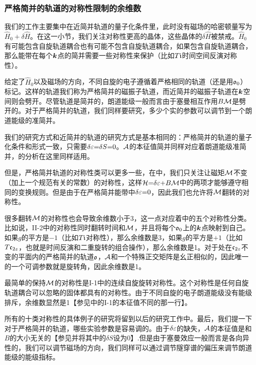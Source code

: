 \subsubsection{严格简并的轨道的对称性限制的余维数}\label{sec:codimexactdeg}

我们的工作主要集中在近简并轨道的量子化条件里，此时没有磁场的哈密顿量写为$\hat{H}_0{+}\delta \hat{H}$。在这一小节，我们关注对称性更高的晶体，这些晶体的$\delta \hat{H}$被禁戒。$\hat{H}_0$有可能包含自旋轨道耦合也有可能不包含自旋轨道耦合，如果包含自旋轨道耦合，那么能带在每个$\boldsymbol{k}$点的简并需要一些对称性来保护（比如$T\mathfrak{i}$时间空间反演对称性）。


给定了$\hat{H}_0$以及磁场的方向，不同自旋的电子遵循着严格相同的轨道（还是用$\mathfrak{o}_0$）标记。这样的轨道我们称为严格简并的磁振子轨道，而近简并的磁振子轨道在$\boldsymbol{k}$空间则会劈开。尽管轨道是简并的，朗道能级一般而言由于塞曼相互作用$B{\cal M}$是劈开的。对于严格简并的轨道，我们同样要研究，多少个实的参数可以调节到一个朗道能级的准简并。


我们的研究方式和近简并的轨道的研究方式是基本相同的：严格简并的轨道的量子化条件\cite{topoferm}和形式一致，只需要$\delta \varepsilon{=}\delta S{=}0$。${\cal A}$的本征值简并同样对应着朗道能级准简并，的分析在这里同样适用。

但是，严格简并轨道的对称性类可以更多一些，在中，我们只关注让磁矩${\cal M}$不变（加上一个规范有关的常数\cite{100p}）的对称性，这样${\cal H}{=}\delta \varepsilon{+}B{\cal M}$中的两项才能够遵守相同的变换规则。但是由于在严格简并能带中$\delta\varepsilon{=}0$，因此我们也允许将${\cal M}$翻转的对称性。

很多翻转${\cal M}$的对称性也会导致余维数小于3，这一点对应着中的五个对称性分类。比如说，II-2中的对称性同时翻转时间和${\cal M}$，并且将每个$\mathfrak{o}_0$上的$\boldsymbol{k}$点映射到自己。如果$g$的平方是$-1$（比如$T\mathfrak{i}$对称性），那么余维数是3，如果$g$的平方是$+1$（比如$T\mathfrak{c}_{2z}$，也就是时间反演和二重旋转的组合操作），那么余维数是1。对于处在$\mathfrak{c}_{2z}$不变的平面内的严格简并的轨道$\mathfrak{o}$，${\cal A}$和一个特殊正交矩阵是幺正相似的\cite{100p,alexandradinata_berry-phase_2016}，因此唯一的一个可调参数就是旋转角，因此余维数是1。


最简单的保持${\cal M}$的对称性是I-1中的连续自旋旋转对称性。这个对称性是任何自旋轨道耦合可以忽略的固体都具有的对称性。由于不同自旋的电子朗道能级没有能级排斥，余维数显然是1【参见中的I-1的本征值不同的那一行】。

所有的十类对称性的具体例子的研究将留到以后的研究工作中。最后，我们提一下对于严格简并的轨道，哪些实验参数是容易调的。由于$\delta\varepsilon$的缺失，${\cal A}$的本征值是和$B$的大小无关的【参见并将其中的$\delta S$设为0】.但是由于塞曼效应一般而言是各向异性的，我们可以调节磁场的方向，我们同样可以通过调节隧穿谱的偏压来调节朗道能级的能级指标。

